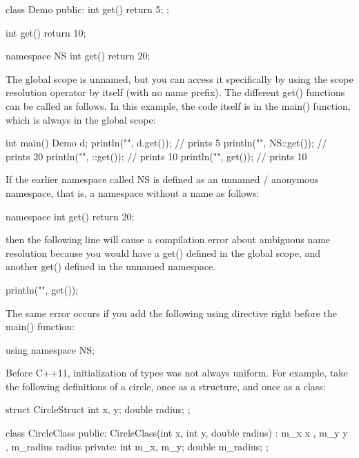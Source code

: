\begin{cpp}
class Demo
{
    public:
    int get() { return 5; }
};

int get() { return 10; }

namespace NS
{
    int get() { return 20; }
}
\end{cpp}

The global scope is unnamed, but you can access it specifically by using the scope resolution operator by itself (with no name prefix). The different get() functions can be called as follows. In this example, the code itself is in the main() function, which is always in the global scope:

\begin{cpp}
int main()
{
    Demo d;
    println("{}", d.get()); // prints 5
    println("{}", NS::get()); // prints 20
    println("{}", ::get()); // prints 10
    println("{}", get()); // prints 10
}
\end{cpp}

If the earlier namespace called NS is defined as an unnamed / anonymous namespace, that is, a namespace without a name as follows:

\begin{cpp}
namespace
{
    int get() { return 20; }
}
\end{cpp}

then the following line will cause a compilation error about ambiguous name resolution because you would have a get() defined in the global scope, and another get() defined in the unnamed namespace.

\begin{cpp}
println("{}", get());
\end{cpp}

The same error occurs if you add the following using directive right before the main() function:

\begin{cpp}
using namespace NS;
\end{cpp}


Before C++11, initialization of types was not always uniform. For example, take the following definitions of a circle, once as a structure, and once as a class:

\begin{cpp}
struct CircleStruct
{
    int x, y;
    double radius;
};

class CircleClass
{
    public:
        CircleClass(int x, int y, double radius)
            : m_x { x }, m_y { y }, m_radius { radius } {}
    private:
        int m_x, m_y;
        double m_radius;
};
\end{cpp}

